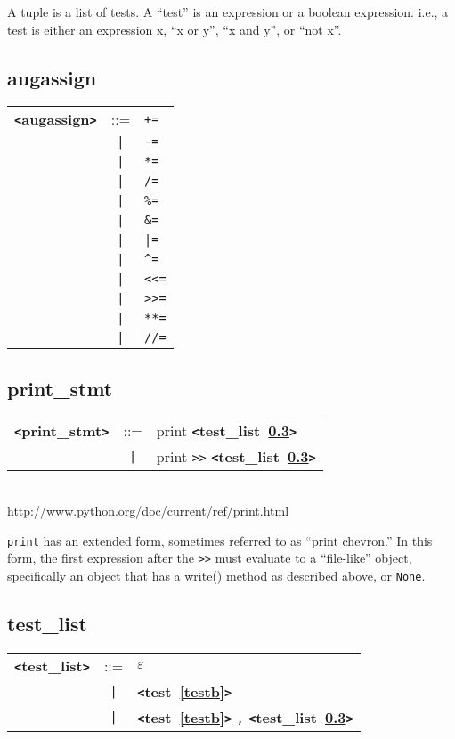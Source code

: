 \documentclass[12pt]{article}
\begin{document}
A tuple is a list of tests.  A ``test'' is an expression or a boolean expression.  i.e., a test is either an expression x, ``x or y'', ``x and y'', or ``not x''.

\subsection{augassign}
\label{augassignb}
\begin{tabular}{lcl}
{\bf \verb+<+augassign\verb+>+} & ::=  & \verb|+=| \\
 & \verb+|+  & \verb|-=| \\
 & \verb+|+  & \verb|*=| \\
 & \verb+|+  & \verb|/=| \\
 & \verb+|+  & \verb|%=| \\
 & \verb+|+  & \verb|&=| \\
 & \verb+|+  & \verb+|=+ \\
 & \verb+|+  & \verb|^=| \\
 & \verb+|+  & \verb|<<=| \\
 & \verb+|+  & \verb|>>=| \\
 & \verb+|+  & \verb|**=| \\
 & \verb+|+  & \verb|//=| \\
\end{tabular}

\subsection{print\_stmt}
\label{printzzzstmtb}
\begin{tabular}{lcl}
{\bf \verb+<+print\_stmt\verb+>+} & ::=  & print {\bf \verb+<+test\_list~\ref{testzzzlistb}\verb+>+}  \\
 & \verb+|+  & print \verb|>>| {\bf \verb+<+test\_list~\ref{testzzzlistb}\verb+>+}  \\
\end{tabular} \\

http://www.python.org/doc/current/ref/print.html

\verb|print| has an extended form, sometimes referred to as ``print chevron.'' 
In this form, the first expression after the \verb+>>+ must evaluate to a ``file-like'' 
object, specifically an object that has a write() method as described above, or \verb|None|.

\subsection{test\_list}
\label{testzzzlistb}
\begin{tabular}{lcl}
{\bf \verb+<+test\_list\verb+>+} & ::=  & $\varepsilon$ \\
 & \verb+|+  & {\bf \verb+<+test~\ref{testb}\verb+>+}  \\
 & \verb+|+  & {\bf \verb+<+test~\ref{testb}\verb+>+}  \verb|,| {\bf \verb+<+test\_list~\ref{testzzzlistb}\verb+>+}  \\
\end{tabular}
\end{document}
